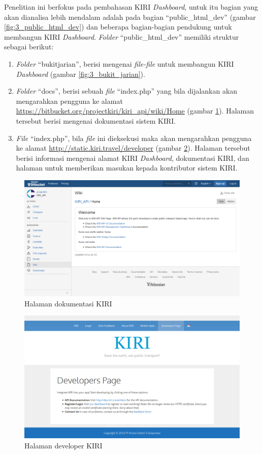 Penelitian ini berfokus pada pembahasan KIRI \textit{Dashboard}, untuk itu bagian yang akan dianalisa lebih mendalam adalah pada bagian ``public\_html\_dev'' (gambar \ref{fig:3_public_html_dev}) dan beberapa bagian-bagian pendukung untuk membangun KIRI \textit{Dashboard}. \textit{Folder} ``public\_html\_dev'' memiliki struktur sebagai berikut:
\begin{enumerate}
	\item \textit{Folder} ``bukitjarian'', berisi mengenai \textit{file-file} untuk membangun KIRI \textit{Dashboard} (gambar \ref{fig:3_bukit_jarian}).
	\item \textit{Folder} ``docs'', berisi sebuah \textit{file} ``index.php'' yang bila dijalankan akan mengarahkan pengguna ke alamat \url{https://bitbucket.org/projectkiri/kiri_api/wiki/Home} (gambar \ref{fig:3_dokumentasi}). Halaman tersebut berisi mengenai dokumentasi sistem KIRI.
	\item \textit{File} ``index.php'', bila \textit{file} ini dieksekusi maka akan mengarahkan pengguna ke alamat \url{http://static.kiri.travel/developer} (gambar \ref{fig:3_developer}). Halaman tersebut berisi informasi mengenai alamat KIRI \textit{Dashboard}, dokumentasi KIRI, dan halaman untuk memberikan masukan kepada kontributor sistem KIRI.
\end{enumerate}

\begin{figure}[htbp]
	\centering
		\includegraphics[scale=0.35]{Gambar/3_dokumentasi.png}
	\caption{Halaman dokumentasi KIRI}
	\label{fig:3_dokumentasi}
\end{figure}

\begin{figure}[htbp]
	\centering
		\includegraphics[scale=0.35]{Gambar/3_developer.png}
	\caption{Halaman developer KIRI}
	\label{fig:3_developer}
\end{figure}


